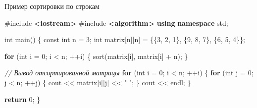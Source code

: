 \documentclass[
]{article}
\newenvironment{Shaded}{}{}
\newcommand{\AttributeTok}[1]{\textcolor[rgb]{0.49,0.56,0.16}{#1}}
\newcommand{\CommentTok}[1]{\textcolor[rgb]{0.38,0.63,0.69}{\textit{#1}}}
\newcommand{\ControlFlowTok}[1]{\textcolor[rgb]{0.00,0.44,0.13}{\textbf{#1}}}
\newcommand{\DataTypeTok}[1]{\textcolor[rgb]{0.56,0.13,0.00}{#1}}
\newcommand{\DecValTok}[1]{\textcolor[rgb]{0.25,0.63,0.44}{#1}}
\newcommand{\ImportTok}[1]{\textcolor[rgb]{0.00,0.50,0.00}{\textbf{#1}}}
\newcommand{\KeywordTok}[1]{\textcolor[rgb]{0.00,0.44,0.13}{\textbf{#1}}}
\newcommand{\NormalTok}[1]{#1}
\newcommand{\OperatorTok}[1]{\textcolor[rgb]{0.40,0.40,0.40}{#1}}
\newcommand{\PreprocessorTok}[1]{\textcolor[rgb]{0.74,0.48,0.00}{#1}}
\newcommand{\StringTok}[1]{\textcolor[rgb]{0.25,0.44,0.63}{#1}}
\begin{document}
Пример сортировки по строкам

\begin{Shaded}
\begin{Highlighting}[]
\PreprocessorTok{\#include }\ImportTok{\textless{}iostream\textgreater{}}
\PreprocessorTok{\#include }\ImportTok{\textless{}algorithm\textgreater{}}
\KeywordTok{using} \KeywordTok{namespace}\NormalTok{ std}\OperatorTok{;}

\DataTypeTok{int}\NormalTok{ main}\OperatorTok{()} \OperatorTok{\{}
    \AttributeTok{const} \DataTypeTok{int}\NormalTok{ n }\OperatorTok{=} \DecValTok{3}\OperatorTok{;}
    \DataTypeTok{int}\NormalTok{ matrix}\OperatorTok{[}\NormalTok{n}\OperatorTok{][}\NormalTok{n}\OperatorTok{]} \OperatorTok{=} \OperatorTok{\{\{}\DecValTok{3}\OperatorTok{,} \DecValTok{2}\OperatorTok{,} \DecValTok{1}\OperatorTok{\},}
                        \OperatorTok{\{}\DecValTok{9}\OperatorTok{,} \DecValTok{8}\OperatorTok{,} \DecValTok{7}\OperatorTok{\},}
                        \OperatorTok{\{}\DecValTok{6}\OperatorTok{,} \DecValTok{5}\OperatorTok{,} \DecValTok{4}\OperatorTok{\}\};}

    \ControlFlowTok{for} \OperatorTok{(}\DataTypeTok{int}\NormalTok{ i }\OperatorTok{=} \DecValTok{0}\OperatorTok{;}\NormalTok{ i }\OperatorTok{\textless{}}\NormalTok{ n}\OperatorTok{;} \OperatorTok{++}\NormalTok{i}\OperatorTok{)} \OperatorTok{\{}
\NormalTok{        sort}\OperatorTok{(}\NormalTok{matrix}\OperatorTok{[}\NormalTok{i}\OperatorTok{],}\NormalTok{ matrix}\OperatorTok{[}\NormalTok{i}\OperatorTok{]} \OperatorTok{+}\NormalTok{ n}\OperatorTok{);}
    \OperatorTok{\}}

    \CommentTok{// Вывод отсортированной матрицы}
    \ControlFlowTok{for} \OperatorTok{(}\DataTypeTok{int}\NormalTok{ i }\OperatorTok{=} \DecValTok{0}\OperatorTok{;}\NormalTok{ i }\OperatorTok{\textless{}}\NormalTok{ n}\OperatorTok{;} \OperatorTok{++}\NormalTok{i}\OperatorTok{)} \OperatorTok{\{}
        \ControlFlowTok{for} \OperatorTok{(}\DataTypeTok{int}\NormalTok{ j }\OperatorTok{=} \DecValTok{0}\OperatorTok{;}\NormalTok{ j }\OperatorTok{\textless{}}\NormalTok{ n}\OperatorTok{;} \OperatorTok{++}\NormalTok{j}\OperatorTok{)} \OperatorTok{\{}
\NormalTok{            cout }\OperatorTok{\textless{}\textless{}}\NormalTok{ matrix}\OperatorTok{[}\NormalTok{i}\OperatorTok{][}\NormalTok{j}\OperatorTok{]} \OperatorTok{\textless{}\textless{}} \StringTok{" "}\OperatorTok{;}
        \OperatorTok{\}}
\NormalTok{        cout }\OperatorTok{\textless{}\textless{}}\NormalTok{ endl}\OperatorTok{;}
    \OperatorTok{\}}

    \ControlFlowTok{return} \DecValTok{0}\OperatorTok{;}
\OperatorTok{\}}
\end{Highlighting}
\end{Shaded}
\end{document}

